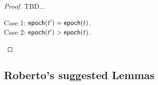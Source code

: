 \documentclass{article}
\begin{document}
\begin{proof}
    TBD...

    \begin{description}
        \item[Case 1: $\mathsf{epoch}(t') = \mathsf{epoch}(t)$.]
        \item[Case 2: $\mathsf{epoch}(t') > \mathsf{epoch}(t)$.]  
    \end{description}
\end{proof}

\subsection*{Roberto's suggested Lemmas}

%
\end{document}
